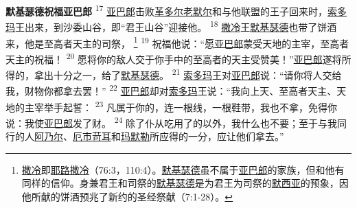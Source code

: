 \textbf{默基瑟德祝福亚巴郎\quad}
\textsuperscript{17}
\uline{亚巴郎}击败\uline{革多尔}\uline{老默尔}和与他联盟的王子回来时，\uline{索多玛}王出来，到沙委山谷，即“君王山谷”迎接他。
\textsuperscript{18}
\uline{撒冷}王\uline{默基}\uline{瑟德}也带了饼酒来，他是至高者天主的司祭，
\footnote{\uline{撒冷}即\uline{耶路撒冷}（76:3，110:4）。\uline{默基}\uline{瑟德}虽不属于\uline{亚巴郎}的家族，但和他有同样的信仰。身兼君王和司祭的\uline{默基}\uline{瑟德}是为君王为司祭的\uline{默西亚}的预象，因他所献的饼酒预兆了新约的圣经祭献（7:1-28）。}
\textsuperscript{19}
祝福他说：“愿\uline{亚巴郎}蒙受天地的主宰，至高者天主的祝福！
\textsuperscript{20}
愿将你的敌人交于你手中的至高者的天主受赞美！”\uline{亚巴郎}遂将所得的，拿出十分之一，给了\uline{默基}\uline{瑟德}。
\textsuperscript{21}
\uline{索多玛}王对\uline{亚巴郎}说：“请你将人交给我，财物你都拿去罢！”
\textsuperscript{22}
\uline{亚巴郎}却对\uline{索多玛}王说：“我向上天、至高者天主、天地的主宰举手起誓：
\textsuperscript{23}
凡属于你的，连一根线，一根鞋带，我也不拿，免得你说：我使\uline{亚巴郎}发了财。
\textsuperscript{24}
除了仆从吃用了的以外，我什么也不要；至于与我同行的人\uline{阿乃尔}、\uline{厄市}\uline{苛耳}和\uline{玛默勒}所应得的一分，应让他们拿去。”

